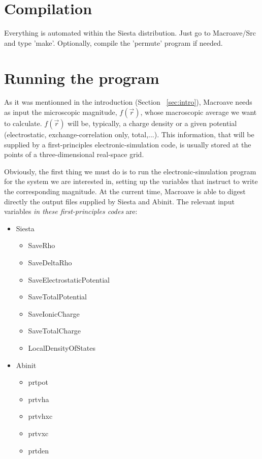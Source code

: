 \section{Compilation}

Everything is automated within the Siesta distribution. 
Just go to Macroave/Src and type 'make'. Optionally, compile
the 'permute' program if needed.

\section{Running the program}

 As it was mentionned in the introduction (Section ~\ref{sec:intro}),
 {\sc Macroave} needs as input the microscopic magnitude,
 $f \left( \vec{r} \right)$, whose macroscopic average we want to calculate. 
 $f \left( \vec{r} \right)$ will be, typically, a charge density
 or a given potential (electrostatic, exchange-correlation only, total,...). 
 This information, that will be supplied by a first-principles
 electronic-simulation code, 
 is usually stored at the points of a three-dimensional 
 real-space grid. 
 
 Obviously, the first thing we must do is to run the 
 electronic-simulation program
 for the system we are interested in, 
 setting up the variables that instruct to write the corresponding
 magnitude. 
 At the current time, {\sc Macroave} is able to digest directly
 the output files supplied by {\sc Siesta} and {\sc Abinit}.
 The relevant input variables {\it in these first-principles codes} are:

 \begin{itemize}
    \item {\sc Siesta}
       \begin{itemize}
          \item SaveRho
          \item SaveDeltaRho
          \item SaveElectrostaticPotential
          \item SaveTotalPotential
          \item SaveIonicCharge
          \item SaveTotalCharge
          \item LocalDensityOfStates
       \end{itemize}
    \item {\sc Abinit}
       \begin{itemize}
          \item prtpot
          \item prtvha
          \item prtvhxc
          \item prtvxc
          \item prtden
       \end{itemize}
 \end{itemize}

